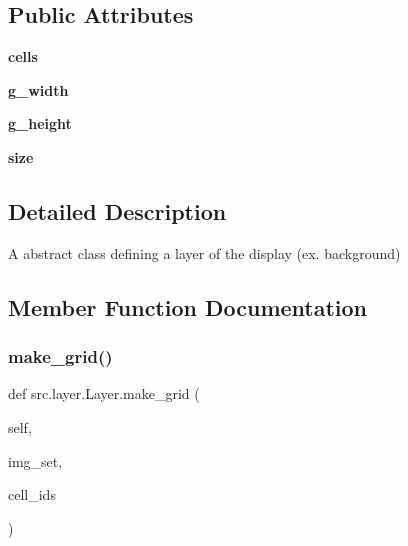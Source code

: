 \subsection*{Public Attributes}
\begin{DoxyCompactItemize}
\item 
\hypertarget{classsrc_1_1layer_1_1_layer_a9b228afc78fa22b3aed57cc426b53956}{}\label{classsrc_1_1layer_1_1_layer_a9b228afc78fa22b3aed57cc426b53956} 
{\bfseries cells}
\item 
\hypertarget{classsrc_1_1layer_1_1_layer_af2a57c9ef96b6855db07ec0cd3dca58e}{}\label{classsrc_1_1layer_1_1_layer_af2a57c9ef96b6855db07ec0cd3dca58e} 
{\bfseries g\+\_\+width}
\item 
\hypertarget{classsrc_1_1layer_1_1_layer_a627dbe4baccfa8b611aa6286677b3d80}{}\label{classsrc_1_1layer_1_1_layer_a627dbe4baccfa8b611aa6286677b3d80} 
{\bfseries g\+\_\+height}
\item 
\hypertarget{classsrc_1_1layer_1_1_layer_ab51fb62aca8248f38b3f3dfe7206fe87}{}\label{classsrc_1_1layer_1_1_layer_ab51fb62aca8248f38b3f3dfe7206fe87} 
{\bfseries size}
\end{DoxyCompactItemize}


\subsection{Detailed Description}
\begin{DoxyVerb}A abstract class defining a layer of the display (ex. background) \end{DoxyVerb}
 

\subsection{Member Function Documentation}
\hypertarget{classsrc_1_1layer_1_1_layer_a6d99c2cef696b679bbc26f4307b21427}{}\label{classsrc_1_1layer_1_1_layer_a6d99c2cef696b679bbc26f4307b21427} 
\subsubsection{\texorpdfstring{make\+\_\+grid()}{make\_grid()}}
{\footnotesize\ttfamily def src.\+layer.\+Layer.\+make\+\_\+grid (\begin{DoxyParamCaption}\item[{}]{self,  }\item[{}]{img\+\_\+set,  }\item[{}]{cell\+\_\+ids }\end{DoxyParamCaption})}

